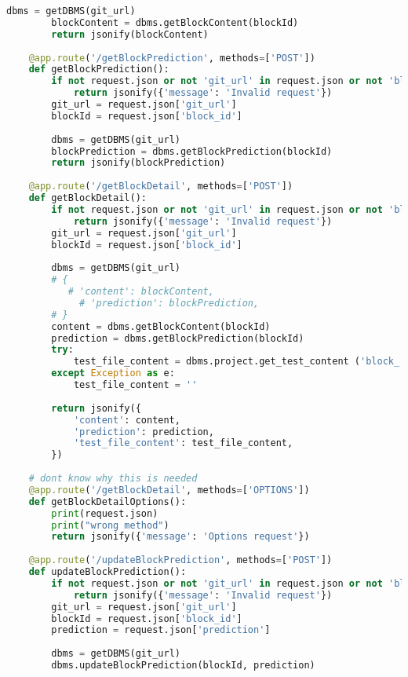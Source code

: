 \begin{lstlisting}[language=Python, caption={$\texttt{main.py}$ file.}, label={lst:15}]
        dbms = getDBMS(git_url)
        blockContent = dbms.getBlockContent(blockId)
        return jsonify(blockContent)
        
    @app.route('/getBlockPrediction', methods=['POST'])
    def getBlockPrediction():
        if not request.json or not 'git_url' in request.json or not 'block_id' in request.json:
            return jsonify({'message': 'Invalid request'})
        git_url = request.json['git_url']
        blockId = request.json['block_id']
        
        dbms = getDBMS(git_url)
        blockPrediction = dbms.getBlockPrediction(blockId)
        return jsonify(blockPrediction)
    
    @app.route('/getBlockDetail', methods=['POST'])
    def getBlockDetail():
        if not request.json or not 'git_url' in request.json or not 'block_id' in request.json:
            return jsonify({'message': 'Invalid request'})
        git_url = request.json['git_url']
        blockId = request.json['block_id']
        
        dbms = getDBMS(git_url)
        # {
           # 'content': blockContent,
             # 'prediction': blockPrediction, 
        # }
        content = dbms.getBlockContent(blockId)
        prediction = dbms.getBlockPrediction(blockId)
        try: 
            test_file_content = dbms.project.get_test_content ('block_' + str(blockId) + '_test.dart')
        except Exception as e:
            test_file_content = ''
            
        return jsonify({
            'content': content,
            'prediction': prediction,
            'test_file_content': test_file_content,
        })
    
    # dont know why this is needed
    @app.route('/getBlockDetail', methods=['OPTIONS'])
    def getBlockDetailOptions():
        print(request.json)
        print("wrong method")
        return jsonify({'message': 'Options request'})
    
    @app.route('/updateBlockPrediction', methods=['POST'])
    def updateBlockPrediction():
        if not request.json or not 'git_url' in request.json or not 'block_id' in request.json or not 'prediction' in request.json:
            return jsonify({'message': 'Invalid request'})
        git_url = request.json['git_url']
        blockId = request.json['block_id']
        prediction = request.json['prediction']
        
        dbms = getDBMS(git_url)
        dbms.updateBlockPrediction(blockId, prediction)
        

\end{lstlisting}
